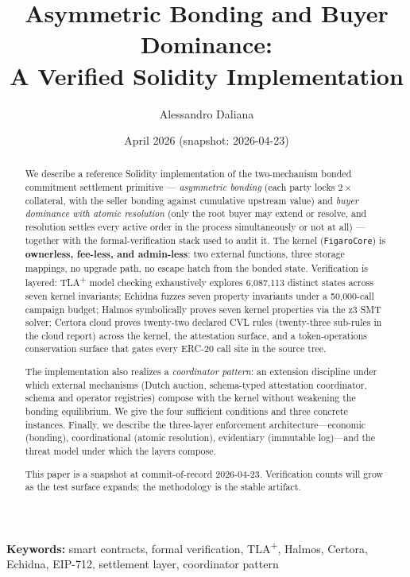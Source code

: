 \documentclass[11pt,a4paper]{article}
\title{%
  Asymmetric Bonding and Buyer Dominance:\\
  A Verified Solidity Implementation%
}
\author{
  Alessandro Daliana
}
\date{April 2026 (snapshot: 2026-04-23)}
\theoremstyle{definition}
\theoremstyle{remark}
\begin{document}
\maketitle

\begin{abstract}
We describe a reference Solidity implementation of the two-mechanism
bonded commitment settlement primitive --- \emph{asymmetric bonding}
(each party locks $2\times$ collateral, with the seller bonding
against cumulative upstream value) and \emph{buyer dominance with
atomic resolution} (only the root buyer may extend or resolve, and
resolution settles every active order in the process simultaneously
or not at all) --- together with the formal-verification stack used
to audit it. The kernel (\texttt{FigaroCore}) is \textbf{ownerless,
fee-less, and admin-less}: two external functions, three storage
mappings, no upgrade path, no escape hatch from the bonded state.
Verification is layered: TLA\textsuperscript{+} model checking
exhaustively explores 6{,}087{,}113 distinct states across seven
kernel invariants; Echidna fuzzes seven property invariants under a
50{,}000-call campaign budget; Halmos symbolically proves seven
kernel properties via the z3 SMT solver; Certora cloud proves
twenty-two declared CVL rules (twenty-three sub-rules in the cloud
report) across the kernel, the attestation surface, and a
token-operations conservation surface that gates every ERC-20 call
site in the source tree.

The implementation also realizes a \emph{coordinator pattern}: an
extension discipline under which external mechanisms (Dutch auction,
schema-typed attestation coordinator, schema and operator registries)
compose with the kernel without weakening the bonding equilibrium.
We give the four sufficient conditions and three concrete instances.
Finally, we describe the three-layer enforcement architecture---economic
(bonding), coordinational (atomic resolution), evidentiary (immutable
log)---and the threat model under which the layers compose.

This paper is a snapshot at commit-of-record 2026-04-23. Verification
counts will grow as the test surface expands; the methodology is the
stable artifact.
\end{abstract}

\medskip
\noindent\textbf{Keywords:}
smart contracts, formal verification, TLA\textsuperscript{+}, Halmos,
Certora, Echidna, EIP-712, settlement layer, coordinator pattern
\end{document}
